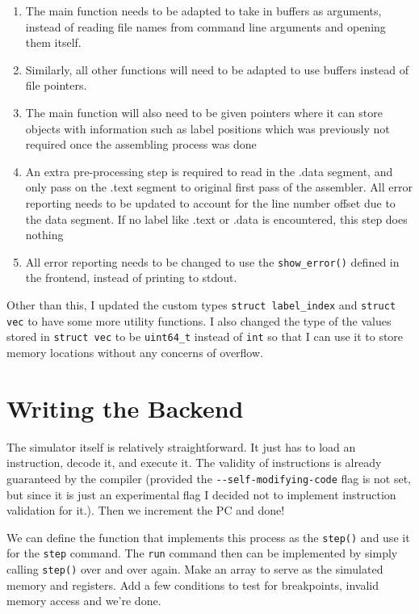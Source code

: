 \documentclass[12pt]{article}
\begin{document}
	\begin{enumerate}
		\item The main function needs to be adapted to take in buffers as arguments, instead of reading file names from command line arguments and opening them itself.
		\item Similarly, all other functions will need to be adapted to use buffers instead of file pointers.
		\item The main function will also need to be given pointers where it can store objects with information such as label positions which was previously not required once the assembling process was done
		\item An extra pre-processing step is required to read in the .data segment, and only pass on the .text segment to original first pass of the assembler. All error reporting needs to be updated to account for the line number offset due to the data segment. If no label like .text or .data is encountered, this step does nothing
		\item All error reporting needs to be changed to use the \verb|show_error()| defined in the frontend, instead of printing to stdout.
	\end{enumerate}

	Other than this, I updated the custom types \verb|struct label_index| and \verb|struct vec| to have some more utility functions. I also changed the type of the values stored in \verb|struct vec| to be \verb|uint64_t| instead of \verb|int| so that I can use it to store memory locations without any concerns of overflow.

	\section{Writing the Backend}
	
	The simulator itself is relatively straightforward. It just has to load an instruction, decode it, and execute it. The validity of instructions is already guaranteed by the compiler (provided the \verb|--self-modifying-code| flag is not set, but since it is just an experimental flag I decided not to implement instruction validation for it.). Then we increment the PC and done! 
	
	We can define the function that implements this process as the \verb|step()| and use it for the \verb|step| command. The \verb|run| command then can be implemented by simply calling \verb|step()| over and over again. Make an array to serve as the simulated memory and registers. Add a few conditions to test for breakpoints, invalid memory access and we're done.
\end{document}

